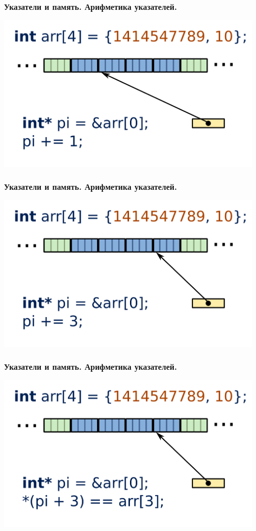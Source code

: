 \documentclass[12pt,pdf,hyperref={unicode}]{beamer}
\begin{document}
\begin{frame}[fragile]
\frametitle{Указатели и память. Арифметика указателей.} 
\begin{center}
\includegraphics[width=0.95\linewidth]{images/memory_different_pointers_3a.png}
\end{center}
\end{frame}

\begin{frame}[fragile]
\frametitle{Указатели и память. Арифметика указателей.} 
\begin{center}
\includegraphics[width=0.95\linewidth]{images/memory_different_pointers_3b.png}
\end{center}
\end{frame}

\begin{frame}[fragile]
\frametitle{Указатели и память. Арифметика указателей.} 
\begin{center}
\includegraphics[width=0.95\linewidth]{images/memory_different_pointers_3c.png}
\end{center}
\end{frame}
\end{document}
